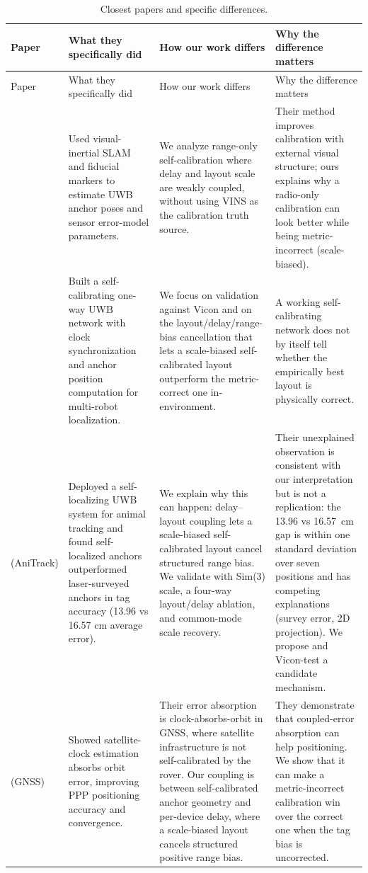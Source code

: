 \documentclass[11pt,a4paper]{article}
\begin{document}
\begin{center}
\small
\begin{longtable}{@{}p{30mm}p{37mm}p{39mm}p{37mm}@{}}
\caption{Closest papers and specific differences.}\\
\toprule
Paper & What they specifically did & How our work differs & Why the difference matters \\
\midrule
\endfirsthead
\toprule
Paper & What they specifically did & How our work differs & Why the difference matters \\
\midrule
\endhead
\citet{lutz_2019_visual_inertial_slam_uwb_error_model} & Used visual-inertial SLAM and fiducial markers to estimate UWB anchor poses and sensor error-model parameters. & We analyze range-only self-calibration where delay and layout scale are weakly coupled, without using VINS as the calibration truth source. & Their method improves calibration with external visual structure; ours explains why a radio-only calibration can look better while being metric-incorrect (scale-biased). \\
\citet{hamer_2018_self_calibrating_ultra_wideband_network} & Built a self-calibrating one-way UWB network with clock synchronization and anchor position computation for multi-robot localization. & We focus on validation against Vicon and on the layout/delay/range-bias cancellation that lets a scale-biased self-calibrated layout outperform the metric-correct one in-environment. & A working self-calibrating network does not by itself tell whether the empirically best layout is physically correct. \\
\citet{luder_2025_anitrack} (AniTrack) & Deployed a self-localizing UWB system for animal tracking and found self-localized anchors outperformed laser-surveyed anchors in tag accuracy (13.96 vs 16.57 cm average error). & We explain why this can happen: delay--layout coupling lets a scale-biased self-calibrated layout cancel structured range bias. We validate with Sim(3) scale, a four-way layout/delay ablation, and common-mode scale recovery. & Their unexplained observation is consistent with our interpretation but is not a replication: the 13.96 vs 16.57~cm gap is within one standard deviation over seven positions and has competing explanations (survey error, 2D projection). We propose and Vicon-test a candidate mechanism. \\
\citet{pan_2015_realtime_ppp_clock_orbit} (GNSS) & Showed satellite-clock estimation absorbs orbit error, improving PPP positioning accuracy and convergence. & Their error absorption is clock-absorbs-orbit in GNSS, where satellite infrastructure is not self-calibrated by the rover. Our coupling is between self-calibrated anchor geometry and per-device delay, where a scale-biased layout cancels structured positive range bias. & They demonstrate that coupled-error absorption can help positioning. We show that it can make a metric-incorrect calibration win over the correct one when the tag bias is uncorrected. \\

\end{longtable}
\end{center}
\end{document}
